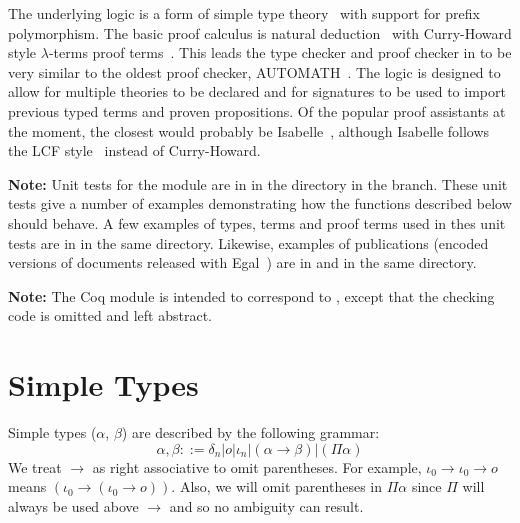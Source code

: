 The underlying logic is a form of simple type theory~\cite{Church40}
with support for prefix polymorphism.
The basic proof calculus is natural deduction~\cite{gent36,praw65}
with Curry-Howard style $\lambda$-terms proof terms~\cite{howa80}.
This leads the type checker and proof checker in {}
to be very similar to the oldest proof checker, AUTOMATH~\cite{DeBruijn80}.
The logic is designed to allow for multiple theories to be
declared and for signatures to be used to import previous
typed terms and proven propositions.
Of the popular proof assistants at the moment,
the closest would probably be Isabelle~\cite{Nipkow-Paulson-Wenzel:2002},
although Isabelle follows the LCF style~\cite{GORDON79} instead of
Curry-Howard.

{\bf{Note:}} Unit tests for the {} module are in {}
in the {}
directory in the {} branch.
These unit tests give a number of examples demonstrating how the functions described below should behave.
A few examples of types, terms and proof terms used in thes unit tests are
in {} in the same directory.
Likewise, examples of publications (encoded versions of documents released with Egal~\cite{Brown2014}) are in
{} and {} in the same directory.

{\bf{Note:}} The Coq module {} is intended to correspond to {},
except that the checking code is omitted and left abstract.

\section{Simple Types}

Simple types ($\alpha$, $\beta$) are described by the following grammar:
$$
\alpha,\beta ::=  \delta_n |o|\iota_n|(\alpha\to\beta)|(\Pi \alpha)
$$
We treat $\to$ as right associative to omit parentheses.
For example, $\iota_0\to\iota_0\to o$
means $(\iota_0\to (\iota_0\to o))$.
Also, we will omit parentheses in $\Pi \alpha$ since
$\Pi$ will always be used above $\to$ and so no
ambiguity can result.


